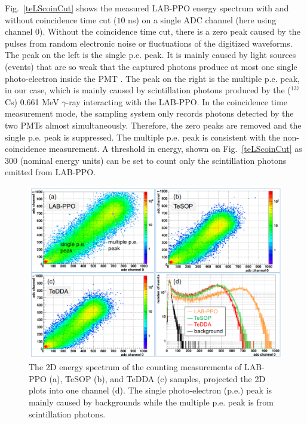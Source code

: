 Fig.~\ref{teLScoinCut} shows the measured LAB-PPO energy spectrum with and without coincidence time cut ($10$ ns) on a single ADC channel (here using channel 0). Without the coincidence time cut, there is a zero peak caused by the pulses from random electronic noise or fluctuations of the digitized waveforms. The peak on the left is the single p.e. peak. It is mainly caused by light sources (events) that are so weak that the captured photons produce at most one single photo-electron inside the PMT \cite{leo2012techniques}. The peak on the right is the multiple p.e. peak, in our case, which is mainly caused by scintillation photons produced by the ($^{137}$Cs) 0.661 MeV $\gamma$-ray interacting with the LAB-PPO. In the coincidence time measurement mode, the sampling system only records photons detected by the two PMTs almost simultaneously. Therefore, the zero peaks are removed and the single p.e. peak is suppressed. The multiple p.e. peak is consistent with the non-coincidence measurement. A threshold in energy, shown on Fig.~\ref{teLScoinCut} as 300 (nominal energy units) can be set to count only the scintillation photons emitted from LAB-PPO. 

\begin{figure}[htbp]
	\centering	
	\includegraphics[width=14cm]{TeLS_2Denergy.png}
	\caption[The 2D energy spectrum of the counting measurements.]{The 2D energy spectrum of the counting measurements of LAB-PPO (a), TeSOP (b), and TeDDA (c) samples, projected the 2D plots into one channel (d). The single photo-electron (p.e.) peak is mainly caused by backgrounds while the multiple p.e. peak is from scintillation photons.}
	\label{teLSresults}
\end{figure}

